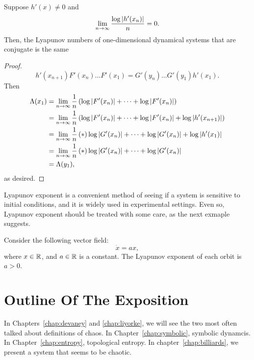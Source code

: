 \documentclass[12pt,twoside]{book}
\begin{document}
\begin{proposition}
  Suppose $h'(x) \neq 0$ and
  \begin{equation*}
    \lim\limits_{n\to \infty} \frac{\log\left | h'(x_n) \right |}{n} = 0.
  \end{equation*}
  Then, the Lyapunov numbers of one-dimensional dynamical systems that are conjugate is the same 
  \label{prop:lyap-conj}
  \begin{proof}
    \begin{equation*}
      h'(x_{n+1})F'(x_n)\ldots F'(x_1) = G'(y_n)\ldots G'(y_1)h'(x_1).
    \end{equation*}
    Then 
    \begin{align*}
      \Lambda(x_1) &= \lim\limits_{n\to \infty} \frac{1}{n}\left ( \log\left | F'(x_n) \right | + \cdots + \log\left | F'(x_n) \right |  \right ) \\
      &= \lim\limits_{n\to \infty} \frac{1}{n}\left(\log\left | F'(x_n) \right | + \cdots + \log\left | F'(x_n) \right | + \log\left | h'(x_{n+1}) \right |\right) \\
      &= \lim\limits_{n\to \infty} \frac{1}{n} \left ( * \right ){ \log\left | G'(x_n) \right | + \cdots + \log\left | G'(x_n) \right | + \log\left | h'(x_1) \right | } \\
      &= \lim\limits_{n\to \infty} \frac{1}{n} \left ( * \right ){ \log\left | G'(x_n) \right | + \cdots + \log\left | G'(x_n) \right | } \\
      &= \Lambda(y_1),
    \end{align*} 
    as desired.
  \end{proof}
\end{proposition}
Lyapunov exponent is a convenient method of seeing if a system is sensitive to initial conditions, and it is widely used in experimental settings.
Even so, Lyapunov exponent should be treated with some care, as the next exmaple suggests.
\begin{example}
  \citep{wiggins}
  Consider the following vector field:
  \begin{equation*}
    \dot{x} = ax,
  \end{equation*}
  where $x \in \mathbb{R}$, and $a \in \mathbb{R}$ is a constant.
  The Lyapunov exponent of each orbit is $a > 0$.
\end{example}
%

\section{Outline Of The Exposition}
In Chapters~\ref{chap:devaney} and \ref{chap:liyorke}, we will see the two most often talked about definitions of chaos.
In Chapter~\ref{chap:symbolic}, symbolic dynamcis.
In Chapter~\ref{chap:entropy}, topological entropy.
In chapter~\ref{chap:billiards}, we present a system that seems to be chaotic.
\end{document}
